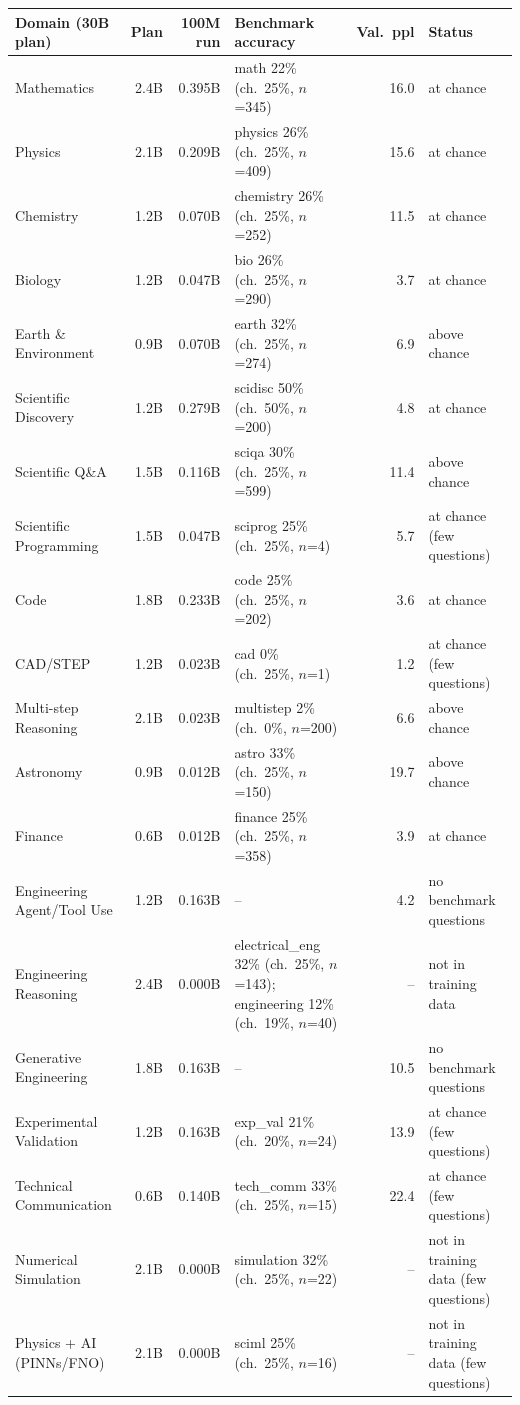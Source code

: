 \begin{tabular}{lrrp{4.7cm}rp{2.9cm}}
\toprule
Domain (30B plan) & Plan & 100M run & Benchmark accuracy & Val.\ ppl & Status \\
\midrule
Mathematics & 2.4B & 0.395B & math 22\% (ch.\ 25\%, $n$=345) & 16.0 & at chance \\
Physics & 2.1B & 0.209B & physics 26\% (ch.\ 25\%, $n$=409) & 15.6 & at chance \\
Chemistry & 1.2B & 0.070B & chemistry 26\% (ch.\ 25\%, $n$=252) & 11.5 & at chance \\
Biology & 1.2B & 0.047B & bio 26\% (ch.\ 25\%, $n$=290) & 3.7 & at chance \\
Earth \& Environment & 0.9B & 0.070B & earth 32\% (ch.\ 25\%, $n$=274) & 6.9 & above chance \\
Scientific Discovery & 1.2B & 0.279B & scidisc 50\% (ch.\ 50\%, $n$=200) & 4.8 & at chance \\
Scientific Q\&A & 1.5B & 0.116B & sciqa 30\% (ch.\ 25\%, $n$=599) & 11.4 & above chance \\
Scientific Programming & 1.5B & 0.047B & sciprog 25\% (ch.\ 25\%, $n$=4) & 5.7 & at chance (few questions) \\
Code & 1.8B & 0.233B & code 25\% (ch.\ 25\%, $n$=202) & 3.6 & at chance \\
CAD/STEP & 1.2B & 0.023B & cad 0\% (ch.\ 25\%, $n$=1) & 1.2 & at chance (few questions) \\
Multi-step Reasoning & 2.1B & 0.023B & multistep 2\% (ch.\ 0\%, $n$=200) & 6.6 & above chance \\
Astronomy & 0.9B & 0.012B & astro 33\% (ch.\ 25\%, $n$=150) & 19.7 & above chance \\
Finance & 0.6B & 0.012B & finance 25\% (ch.\ 25\%, $n$=358) & 3.9 & at chance \\
Engineering Agent/Tool Use & 1.2B & 0.163B & -- & 4.2 & no benchmark questions \\
Engineering Reasoning & 2.4B & 0.000B & electrical\_eng 32\% (ch.\ 25\%, $n$=143); engineering 12\% (ch.\ 19\%, $n$=40) & -- & not in training data \\
Generative Engineering & 1.8B & 0.163B & -- & 10.5 & no benchmark questions \\
Experimental Validation & 1.2B & 0.163B & exp\_val 21\% (ch.\ 20\%, $n$=24) & 13.9 & at chance (few questions) \\
Technical Communication & 0.6B & 0.140B & tech\_comm 33\% (ch.\ 25\%, $n$=15) & 22.4 & at chance (few questions) \\
Numerical Simulation & 2.1B & 0.000B & simulation 32\% (ch.\ 25\%, $n$=22) & -- & not in training data (few questions) \\
Physics + AI (PINNs/FNO) & 2.1B & 0.000B & sciml 25\% (ch.\ 25\%, $n$=16) & -- & not in training data (few questions) \\
\bottomrule
\end{tabular}
